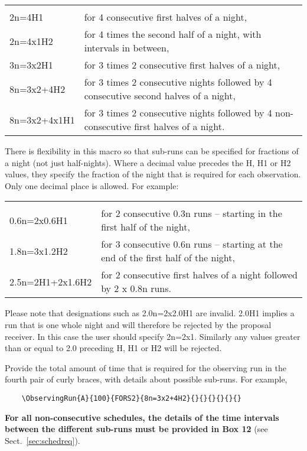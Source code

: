 \documentclass{article}
\begin{document}
\begin{tabular}{ll}
& \\
2n=4H1     & for 4 consecutive first halves of a night, \\
2n=4x1H2   & for 4 times the second half of a night, with intervals in between,\\   
3n=3x2H1  & for 3 times 2 consecutive first halves of a night, \\   
8n=3x2+4H2& for 3 times 2 consecutive nights followed by 4 consecutive second halves of a night, \\
8n=3x2+4x1H1& for 3 times 2 consecutive nights followed by 4 non-consecutive first halves of a night. \\
\end{tabular}

\bigskip

There is flexibility in this macro so that sub-runs
can be specified for fractions of a night  (not just half-nights).
Where a decimal value precedes the H, H1 or H2 values, they specify the
fraction of the night that is required for each observation. Only
one decimal place is allowed.
For example:

\begin{tabular}{ll}
& \\
0.6n=2x0.6H1     & for 2 consecutive 0.3n runs -- starting in the first half of the night, \\
1.8n=3x1.2H2    & for  3 consecutive 0.6n runs -- starting at the end of the first half of the night, \\
2.5n=2H1+2x1.6H2 & for 2 consecutive first halves of a night followed by 2 x 0.8n runs.\\
\end{tabular}

Please note that designations such as 2.0n=2x2.0H1 are invalid. 2.0H1 implies a run that is one whole night and will therefore be rejected by the proposal receiver.
In this case the user should specify 2n=2x1.
Similarly any values greater than or equal to 2.0 preceding
H, H1 or H2 will be rejected.

\bigskip

Provide the total amount of time
that is required for the observing run in the fourth pair of curly braces, with details about
possible sub-runs.  For example,

\begin{verbatim}
    \ObservingRun{A}{100}{FORS2}{8n=3x2+4H2}{}{}{}{}{}{}
\end{verbatim}
{\bf For all non-consecutive schedules, the details of the time
  intervals between the different sub-runs must be provided in Box
  12} (see Sect.~\ref{sec:schedreq}). \\
\end{document}
